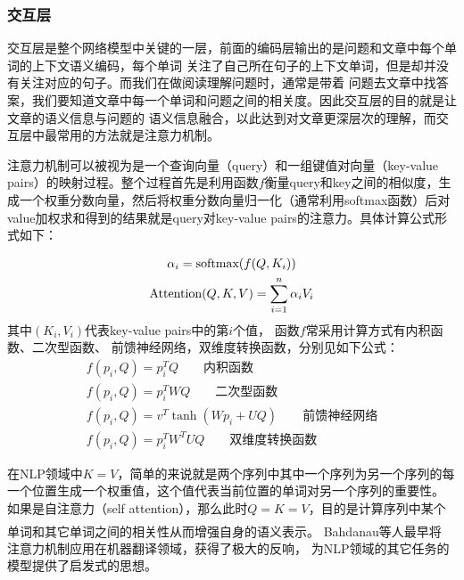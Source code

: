\documentclass{article}
\newcommand{\upcite}[1]{\textsuperscript{\textsuperscript{\cite{#1}}}}
\begin{document}
\subsubsection{交互层}
交互层是整个网络模型中关键的一层，前面的编码层输出的是问题和文章中每个单词的上下文语义编码，每个单词
关注了自己所在句子的上下文单词，但是却并没有关注对应的句子。而我们在做阅读理解问题时，通常是带着
问题去文章中找答案，我们要知道文章中每一个单词和问题之间的相关度。因此交互层的目的就是让文章的语义信息与问题的
语义信息融合，以此达到对文章更深层次的理解，而交互层中最常用的方法就是注意力机制。

注意力机制可以被视为是一个查询向量（query）和一组键值对向量（key-value pairs）的映射过程。整个过程首先是利用函数$f$衡量query和key之间的相似度，生成一个权重分数向量，然后将权重分数向量归一化（通常利用softmax函数）后对value加权求和得到的结果就是query对key-value pairs的注意力。具体计算公式形式如下：

\begin{gather}
\alpha_i=\text{softmax}(f(Q,K_i)) \notag \\
\text{Attention}(Q,K,V)=\sum_{i=1}^{n}\alpha_iV_i
\end{gather}
其中$(K_i,V_i)$代表key-value pairs中的第$i$个值，
函数$f$常采用计算方式有内积函数、二次型函数、
前馈神经网络，双维度转换函数，分别见如下公式：
\begin{gather}
f(p_i,Q)=p_i^TQ \qquad \text{内积函数} \\
f(p_i,Q)=p_i^TWQ\qquad \text{二次型函数}\\
f(p_i,Q)=v^T\tanh(Wp_i+UQ)\qquad \text{前馈神经网络} \\
f(p_i,Q)=p_i^TW^TUQ \qquad \text{双维度转换函数}
\end{gather}

在NLP领域中$K=V$，简单的来说就是两个序列中其中一个序列为另一个序列的每一个位置生成一个权重值，这个值代表当前位置的单词对另一个序列的重要性。
如果是自注意力（self attention），那么此时$Q=K=V$，目的是计算序列中某个单词和其它单词之间的相关性从而增强自身的语义表示。
Bahdanau等人\upcite{Bahdanau}最早将
注意力机制应用在机器翻译领域，获得了极大的反响，
为NLP领域的其它任务的模型提供了启发式的思想。
\end{document}
